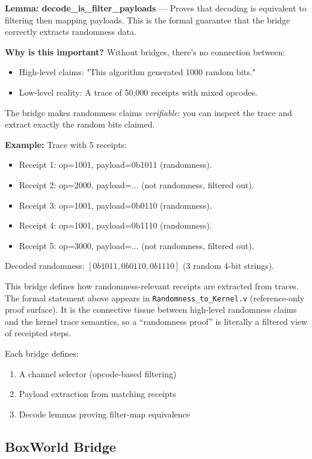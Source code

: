 \textbf{Lemma: decode\_is\_filter\_payloads} — Proves that decoding is equivalent to filtering then mapping payloads. This is the formal guarantee that the bridge correctly extracts randomness data.

\textbf{Why is this important?} Without bridges, there's no connection between:
\begin{itemize}
    \item High-level claims: "This algorithm generated 1000 random bits."
    \item Low-level reality: A trace of 50,000 receipts with mixed opcodes.
\end{itemize}
The bridge makes randomness claims \textit{verifiable}: you can inspect the trace and extract exactly the random bits claimed.

\textbf{Example:} Trace with 5 receipts:
\begin{itemize}
    \item Receipt 1: op=1001, payload=0b1011 (randomness).
    \item Receipt 2: op=2000, payload=... (not randomness, filtered out).
    \item Receipt 3: op=1001, payload=0b0110 (randomness).
    \item Receipt 4: op=1001, payload=0b1110 (randomness).
    \item Receipt 5: op=3000, payload=... (not randomness, filtered out).
\end{itemize}
Decoded randomness: $[0b1011, 0b0110, 0b1110]$ (3 random 4-bit strings).

This bridge defines how randomness-relevant receipts are extracted from traces.
The formal statement above appears in \texttt{Randomness\_to\_Kernel.v} (reference-only proof surface). It is the connective tissue between high-level randomness claims and the kernel trace semantics, so a ``randomness proof'' is literally a filtered view of receipted steps.


Each bridge defines:
\begin{enumerate}
    \item A channel selector (opcode-based filtering)
    \item Payload extraction from matching receipts
    \item Decode lemmas proving filter-map equivalence
\end{enumerate}

\subsection{BoxWorld Bridge}

